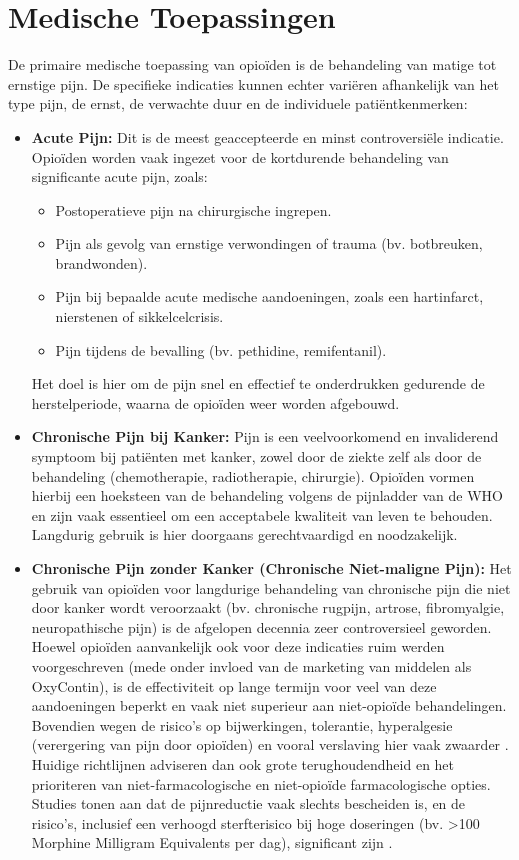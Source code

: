 \documentclass[11pt, a4paper]{report} %
\begin{document}
\section{Medische Toepassingen}
De primaire medische toepassing van opioïden is de behandeling van matige tot ernstige pijn. De specifieke indicaties kunnen echter variëren afhankelijk van het type pijn, de ernst, de verwachte duur en de individuele patiëntkenmerken:
\begin{itemize}
    \item \textbf{Acute Pijn:} Dit is de meest geaccepteerde en minst controversiële indicatie. Opioïden worden vaak ingezet voor de kortdurende behandeling van significante acute pijn, zoals:
        \begin{itemize}
            \item Postoperatieve pijn na chirurgische ingrepen.
            \item Pijn als gevolg van ernstige verwondingen of trauma (bv. botbreuken, brandwonden).
            \item Pijn bij bepaalde acute medische aandoeningen, zoals een hartinfarct, nierstenen of sikkelcelcrisis.
            \item Pijn tijdens de bevalling (bv. pethidine, remifentanil).
        \end{itemize}
        Het doel is hier om de pijn snel en effectief te onderdrukken gedurende de herstelperiode, waarna de opioïden weer worden afgebouwd.
    \item \textbf{Chronische Pijn bij Kanker:} Pijn is een veelvoorkomend en invaliderend symptoom bij patiënten met kanker, zowel door de ziekte zelf als door de behandeling (chemotherapie, radiotherapie, chirurgie). Opioïden vormen hierbij een hoeksteen van de behandeling volgens de pijnladder van de WHO en zijn vaak essentieel om een acceptabele kwaliteit van leven te behouden. Langdurig gebruik is hier doorgaans gerechtvaardigd en noodzakelijk.
    \item \textbf{Chronische Pijn zonder Kanker (Chronische Niet-maligne Pijn):} Het gebruik van opioïden voor langdurige behandeling van chronische pijn die niet door kanker wordt veroorzaakt (bv. chronische rugpijn, artrose, fibromyalgie, neuropathische pijn) is de afgelopen decennia zeer controversieel geworden. Hoewel opioïden aanvankelijk ook voor deze indicaties ruim werden voorgeschreven (mede onder invloed van de marketing van middelen als OxyContin), is de effectiviteit op lange termijn voor veel van deze aandoeningen beperkt en vaak niet superieur aan niet-opioïde behandelingen. Bovendien wegen de risico's op bijwerkingen, tolerantie, hyperalgesie (verergering van pijn door opioïden) en vooral verslaving hier vaak zwaarder \parencite{Hooten2021OpioidsChronicPain}. Huidige richtlijnen adviseren dan ook grote terughoudendheid en het prioriteren van niet-farmacologische en niet-opioïde farmacologische opties. Studies tonen aan dat de pijnreductie vaak slechts bescheiden is, en de risico's, inclusief een verhoogd sterfterisico bij hoge doseringen (bv. >100 Morphine Milligram Equivalents per dag), significant zijn \parencite{Hooten2021OpioidsChronicPain}.

\end{itemize}
\end{document}
